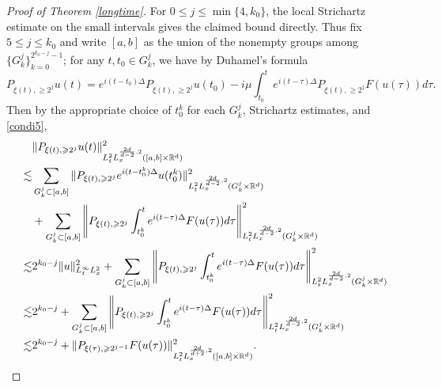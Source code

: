 \documentclass[reqno,11pt]{amsart}
\theoremstyle{plain}
\theoremstyle{definition}
\numberwithin{equation}{section}
\numberwithin{theorem}{section}
\def\geq{\geqslant}
\def\leq{\leqslant}
\begin{document}
\begin{proof}[Proof of Theorem \ref{longtime}]
For $0\leq j\leq\min\{4,k_0\}$, the local Strichartz estimate on the small intervals gives the claimed bound directly. Thus fix $5\leq j\leq k_0$ and write $[a,b]$ as the union of the nonempty groups among $\{G_k^j\}_{k=0}^{2^{k_0-j}-1}$;  for any $t, t_0 \in G_k^j$, we have by Duhamel's formula
\[ 
P_{\xi (t), \geq 2^j} u(t) = e^{i(t-t_0)\Delta} P_{\xi (t), \geq 2^j} u(t_0) - i\mu \int_{t_0}^t e^{i(t-\tau)\Delta} P_{\xi (t), \geq 2^j} F(u(\tau)) d\tau. 
\]
Then by the appropriate choice of  $t_0^k$  for each $G_k^j$,  Strichartz estimates, and \eqref{condi5},
\begin{align}\notag
&\|P_{\xi (t), \geq 2^j} u(t)\|_{L_t^2 L_x^{\frac{2d}{d-2},2} ([a,b] \times \mathbb{R}^d)}^2\\\notag
\lesssim&\sum_{G_k^j \subset [a,b]} \|P_{\xi (t), \geq 2^j} e^{i(t-t_0^k)\Delta}u(t_0^k)\|_{L_t^2 L_x^{\frac{2d}{d-2},2} (G_k^j \times \mathbb{R}^d)}^2\\\notag
&+ \sum_{G_k^j \subset [a,b]} \left\|P_{\xi (t), \geq 2^j} \int_{t_0^k}^t e^{i(t-\tau)\Delta} F(u(\tau)) d\tau\right\|_{L_t^2 L_x^{\frac{2d}{d-2},2} (G_k^j \times \mathbb{R}^d)}^2\\\notag
\lesssim&2^{k_0-j}\|u\|^2_{L_t^{\infty}L_x^2}+ \sum_{G_k^j \subset [a,b]} \left\|P_{\xi (t), \geq 2^j} \int_{t_0^k}^t e^{i(t-\tau)\Delta} F(u(\tau)) d\tau\right\|_{L_t^2 L_x^{\frac{2d}{d-2},2} (G_k^j \times \mathbb{R}^d)}^2\\\notag
\lesssim& 2^{k_0-j}+\sum_{G_k^j \subset [a,b]} \left\|P_{\xi (t), \geq 2^j} \int_{t_0^k}^t e^{i(t-\tau)\Delta} F(u(\tau)) d\tau\right\|_{L_t^2 L_x^{\frac{2d}{d-2},2} (G_k^j \times \mathbb{R}^d)}^2\\\label{estq0}
\lesssim& 2^{k_0-j}+ \|P_{\xi (\tau), \geq 2^{j-1}} F(u(\tau))\|_{L_t^2 L_x^{\frac{2d}{d+2},2} ([a,b] \times \mathbb{R}^d)}^2.
\end{align}


\end{proof}
\end{document}
